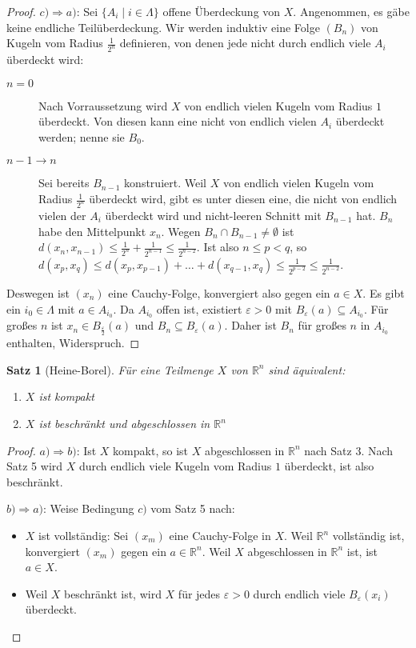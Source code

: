 \documentclass[10pt,a4paper]{report}
\newtheorem{satz}{Satz}
\begin{document}
\begin{proof}
  $c) \Rightarrow a)$: Sei $\{ A_{i} \mid i \in \Lambda \}$ offene Überdeckung von $X$.
  Angenommen, es gäbe keine endliche Teilüberdeckung.
  Wir werden induktiv eine Folge $(B_{n})$ von Kugeln vom Radius $\frac{1}{2^{n}}$ definieren, von denen jede nicht durch endlich viele $A_{i}$ überdeckt wird:
  \begin{description}
  \item[$n = 0$] Nach Vorraussetzung wird $X$ von endlich vielen Kugeln vom Radius $1$ überdeckt.
    Von diesen kann eine nicht von endlich vielen $A_{i}$ überdeckt werden; nenne sie $B_{0}$.
  \item[$n - 1 \rightarrow n$] Sei bereits $B_{n - 1}$ konstruiert.
    Weil $X$ von endlich vielen Kugeln vom Radius $\frac{1}{2^{n}}$ überdeckt wird, gibt es unter diesen eine, die nicht von endlich vielen der $A_{i}$ überdeckt wird und nicht-leeren Schnitt mit $B_{n - 1}$ hat.
    $B_{n}$ habe den Mittelpunkt $x_{n}$.
    Wegen $B_{n} \cap B_{n - 1} \ne \emptyset$ ist $d(x_{n}, x_{n - 1}) \le \frac{1}{2^{n}} + \frac{1}{2^{n - 1}} \le \frac{1}{2^{n - 2}}$.
    Ist also $n \le p < q$, so $d(x_{p}, x_{q}) \le d(x_{p}, x_{p - 1}) + \dots + d(x_{q - 1}, x_{q}) \le \frac{1}{2^{p - 2}} \le \frac{1}{2^{n - 2}}$.
  \end{description}
  Deswegen ist $(x_{n})$ eine Cauchy-Folge, konvergiert also gegen ein $a \in X$.
  Es gibt ein $i_{0} \in \Lambda$ mit $a \in A_{i_{0}}$.
  Da $A_{i_{0}}$ offen ist, existiert $\varepsilon > 0$ mit $B_{\varepsilon}(a) \subseteq A_{i_{0}}$.
  Für großes $n$ ist $x_{n} \in B_{\frac{\varepsilon}{2}}(a)$ und $B_{n} \subseteq B_{\varepsilon}(a)$.
  Daher ist $B_{n}$ für großes $n$ in $A_{i_{0}}$ enthalten, Widerspruch.
\end{proof}

\begin{satz}[Heine-Borel]
  Für eine Teilmenge $X$ von $\mathbb{R}^{n}$ sind äquivalent:
  \begin{enumerate}[label={\alph*)}]
  \item $X$ ist kompakt
  \item $X$ ist beschränkt und abgeschlossen in $\mathbb{R}^{n}$
  \end{enumerate}
\end{satz}

\begin{proof}
  $a) \Rightarrow b)$: Ist $X$ kompakt, so ist $X$ abgeschlossen in $\mathbb{R}^{n}$ nach Satz 3.
  Nach Satz 5 wird $X$ durch endlich viele Kugeln vom Radius $1$ überdeckt, ist also beschränkt.

  $b) \Rightarrow a)$: Weise Bedingung $c)$ vom Satz 5 nach:
  \begin{itemize}
  \item $X$ ist vollständig: Sei $(x_{m})$ eine Cauchy-Folge in $X$.
    Weil $\mathbb{R}^{n}$ vollständig ist, konvergiert $(x_{m})$ gegen ein $a \in \mathbb{R}^{n}$.
    Weil $X$ abgeschlossen in $\mathbb{R}^{n}$ ist, ist $a \in X$.
  \item Weil $X$ beschränkt ist, wird $X$ für jedes $\varepsilon > 0$ durch endlich viele $B_{\varepsilon}(x_{i})$ überdeckt.
  \end{itemize}
\end{proof}
\end{document}

